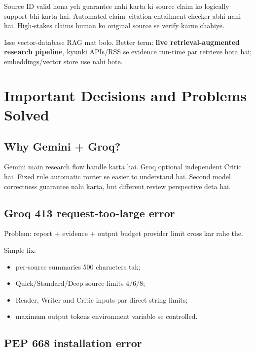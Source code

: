 \documentclass[11pt,a4paper]{article}
\begin{document}
\begin{keybox}
Source ID valid hona yeh guarantee nahi karta ki source claim ko logically support bhi karta hai. Automated claim--citation entailment checker abhi nahi hai. High-stakes claims human ko original source se verify karne chahiye.
\end{keybox}

Isse vector-database RAG mat bolo. Better term: \textbf{live retrieval-augmented research pipeline}, kyunki APIs/RSS se evidence run-time par retrieve hota hai; embeddings/vector store use nahi hote.

\section{Important Decisions and Problems Solved}

\subsection{Why Gemini + Groq?}

Gemini main research flow handle karta hai. Groq optional independent Critic hai. Fixed rule automatic router se easier to understand hai. Second model correctness guarantee nahi karta, but different review perspective deta hai.

\subsection{Groq 413 request-too-large error}

Problem: report + evidence + output budget provider limit cross kar rahe the.

Simple fix:

\begin{itemize}
  \item per-source summaries 500 characters tak;
  \item Quick/Standard/Deep source limits 4/6/8;
  \item Reader, Writer and Critic inputs par direct string limits;
  \item maximum output tokens environment variable se controlled.
\end{itemize}

\subsection{PEP 668 installation error}
\end{document}
